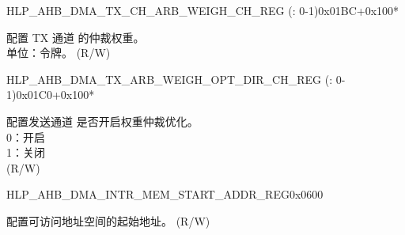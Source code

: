 \begin{register}{H}{LP\_AHB\_DMA\_TX\_CH\_ARB\_WEIGH\_CH\_REG (: 0-1)}{0x01BC+0x100*}\label{regdesc:LPAHBDMATXCHARBWEIGHCHNREG}
%
%
\regnewline%
\begin{regdesc}\begin{reglist}
\label{fielddesc:LPAHBDMATXCHARBWEIGHCHN}\item [LP\_AHB\_DMA\_TX\_CH\_ARB\_WEIGH\_CH\regindex{n}] 配置 TX 通道  的仲裁权重。\\单位：令牌。 (R/W)
\end{reglist}\end{regdesc}
\end{register}


\begin{register}{H}{LP\_AHB\_DMA\_TX\_ARB\_WEIGH\_OPT\_DIR\_CH\_REG (: 0-1)}{0x01C0+0x100*}\label{regdesc:LPAHBDMATXARBWEIGHOPTDIRCHNREG}
%
%
\regnewline%
\begin{regdesc}\begin{reglist}
\label{fielddesc:LPAHBDMATXARBWEIGHOPTDIRCHN}\item [LP\_AHB\_DMA\_TX\_ARB\_WEIGH\_OPT\_DIR\_CH\regindex{n}] 配置发送通道  是否开启权重仲裁优化。\\
0：开启\\
1：关闭\\ (R/W)
\end{reglist}\end{regdesc}
\end{register}


\begin{register}{H}{LP\_AHB\_DMA\_INTR\_MEM\_START\_ADDR\_REG}{0x0600}\label{regdesc:LPAHBDMAINTRMEMSTARTADDRREG}
%
\regnewline%
\begin{regdesc}\begin{reglist}
\label{fielddesc:LPAHBDMAACCESSINTRMEMSTARTADDR}\item [LP\_AHB\_DMA\_ACCESS\_INTR\_MEM\_START\_ADDR] 配置可访问地址空间的起始地址。 (R/W)
\end{reglist}\end{regdesc}
\end{register}


